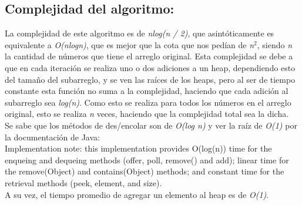 \documentclass[10pt, a4paper]{article}
\begin{document}
		\subsection{Complejidad del algoritmo:}
		La complejidad de este algoritmo es de \textit{nlog(n / 2)}, que asint\'oticamente es equivalente a \textit{O(nlogn)}, que es mejor que la cota que nos ped\'ian de \textit{n$^{2}$}, siendo \textit{n} la cantidad de n\'umeros que tiene el arreglo original. Esta complejidad se debe a que en cada iteraci\'on se realiza uno o dos adiciones a un heap, dependiendo esto del tama\~no del subarreglo, y se ven las ra\'ices de los heaps, pero al ser de tiempo constante esta funci\'on no suma a la complejidad, haciendo que cada adici\'on al subarreglo sea \textit{log(n)}. Como esto se realiza para todos los n\'umeros en el arreglo original, esto se realiza \textit{n} veces, haciendo que la complejidad total sea la dicha.
		\\Se sabe que los m\'etodos de des/encolar son de \textit{O(log n)} y ver la ra\'iz de \textit{O(1)} por la documentaci\'on de Java:
		\\Implementation note: this implementation provides O(log(n)) time for the enqueing and dequeing methods (offer, poll, remove() and add); linear time for the remove(Object) and contains(Object) methods; and constant time for the retrieval methods (peek, element, and size).
		\\A su vez, el tiempo promedio de agregar un elemento al heap es de \textit{O(1)}.
\end{document}
